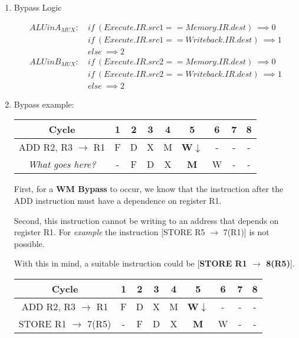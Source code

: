 \documentclass[12pt]{article}
\newenvironment{QandA}{\begin{enumerate}[label=\bfseries\arabic*.]\bfseries}
                      {\end{enumerate}}
\newenvironment{answered}{\par\quad\normalfont}{}
\begin{document}
\begin{QandA}
    \item Bypass Logic
    \begin{answered}
        \begin{equation*}
        \begin{split}
        ALUinA_{MUX} : &\ if\ (Execute.IR.src1 == Memory.IR.dest)\ \implies 0\\ &\ if\ (Execute.IR.src1 == Writeback.IR.dest)\ \implies 1\\ &\ else\ \implies 2
        \end{split}
        \end{equation*}
        \begin{equation*}
        \begin{split}
        ALUinB_{MUX} : &\ if\ (Execute.IR.src2 == Memory.IR.dest)\ \implies 0\\ &\ if\ (Execute.IR.src2 == Writeback.IR.dest)\ \implies 1\\ &\ else\ \implies 2
        \end{split}
        \end{equation*}        
    \end{answered}
    
    \item Bypass example:
    \begin{answered}
    \begin{center}
    \begin{tabular}{ |c|c|c|c|c|c|c|c|c| } 
     \hline
     Cycle & 1 & 2 & 3 & 4 & 5 & 6 & 7 & 8 \\ 
     \hline
     ADD R2, R3 $\rightarrow$ R1 & F & D & X & M & \textbf{W}$\downarrow$ & - & - & - \\ 
     \textit{What goes here?} & - & F & D & X & \textbf{M } & W & - & - \\ 
     \hline
    \end{tabular}
    \end{center}
    First, for a \textbf{WM Bypass} to occur, we know that the instruction after the ADD instruction must have a dependence on register R1. 
    
    Second, this instruction cannot be writing to an address that depends on register R1. For \textit{example} the instruction [STORE R5 $\rightarrow$ 7(R1)] is not possible.
    
    With this in mind, a suitable instruction could be [\textbf{STORE R1 $\rightarrow$ 8(R5)}].
    \begin{center}
    \begin{tabular}{ |c|c|c|c|c|c|c|c|c| } 
     \hline
     Cycle & 1 & 2 & 3 & 4 & 5 & 6 & 7 & 8 \\ 
     \hline
     ADD R2, R3 $\rightarrow$ R1 & F & D & X & M & \textbf{W}$\downarrow$ & - & - & - \\ 
     STORE R1 $\rightarrow$ 7(R5) & - & F & D & X & \textbf{M } & W & - & - \\ 
     \hline
    \end{tabular}
    \end{center}    
    \end{answered}
    

\end{QandA}
\end{document}
